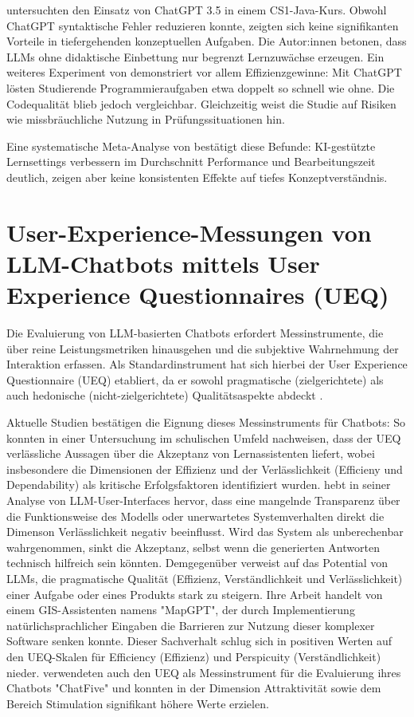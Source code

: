 \textcite[S.~3-6]{XueIntro2024} untersuchten den Einsatz von ChatGPT 3.5 in einem CS1-Java-Kurs. Obwohl ChatGPT syntaktische Fehler reduzieren konnte, zeigten sich keine signifikanten Vorteile in tiefergehenden konzeptuellen Aufgaben. Die Autor:innen betonen, dass LLMs ohne didaktische Einbettung nur begrenzt Lernzuwächse erzeugen.
Ein weiteres Experiment von \textcite[S.~6-8]{TobaTests2024} demonstriert vor allem Effizienzgewinne: Mit ChatGPT lösten Studierende Programmieraufgaben etwa doppelt so schnell wie ohne. Die Codequalität blieb jedoch vergleichbar. Gleichzeitig weist die Studie auf Risiken wie missbräuchliche Nutzung in Prüfungssituationen hin.

Eine systematische Meta-Analyse von \textcite[S.~12-15]{Alanazi2025} bestätigt diese Befunde: KI-gestützte Lernsettings verbessern im Durchschnitt Performance und Bearbeitungszeit deutlich, zeigen aber keine konsistenten Effekte auf tiefes Konzeptverständnis.



\section{User-Experience-Messungen von LLM-Chatbots mittels User Experience Questionnaires (UEQ)}
Die Evaluierung von LLM-basierten Chatbots erfordert Messinstrumente, die über reine Leistungsmetriken hinausgehen und die subjektive Wahrnehmung der Interaktion erfassen. Als Standardinstrument hat sich hierbei der User Experience Questionnaire (UEQ) etabliert, da er sowohl pragmatische (zielgerichtete) als auch hedonische (nicht-zielgerichtete) Qualitätsaspekte abdeckt \parencite[S.~2-3]{Schrepp2023UEQHandbook}.

Aktuelle Studien bestätigen die Eignung dieses Messinstruments für Chatbots: So konnten \textcite[S.~17]{Mendoza2022} in einer Untersuchung im schulischen Umfeld nachweisen, dass der UEQ verlässliche Aussagen über die Akzeptanz von Lernassistenten liefert, wobei insbesondere die Dimensionen der Effizienz und der Verlässlichkeit (Efficieny und Dependability) als kritische Erfolgsfaktoren identifiziert wurden. \textcite[]{Ambacher2024} hebt in seiner Analyse von LLM-User-Interfaces hervor, dass eine mangelnde Transparenz über die Funktionsweise des Modells oder unerwartetes Systemverhalten direkt die Dimenson Verlässlichkeit negativ beeinflusst. Wird das System als unberechenbar wahrgenommen, sinkt die Akzeptanz, selbst wenn die generierten Antworten technisch hilfreich sein könnten. Demgegenüber verweist \textcite[S.~6]{Shahu2025} auf das Potential von LLMs, die pragmatische Qualität (Effizienz, Verständlichkeit und Verlässlichkeit) einer Aufgabe oder eines Produkts stark zu steigern. Ihre Arbeit handelt von einem GIS-Assistenten namens "MapGPT", der durch Implementierung natürlichsprachlicher Eingaben die Barrieren zur Nutzung dieser komplexer Software senken konnte. Dieser Sachverhalt schlug sich in positiven Werten auf den UEQ-Skalen für Efficiency (Effizienz) und Perspicuity (Verständlichkeit) nieder. \textcite[S.~5-6]{Lee2024} verwendeten auch den UEQ als Messinstrument für die Evaluierung ihres Chatbots "ChatFive" und konnten in der Dimension Attraktivität sowie dem Bereich Stimulation signifikant höhere Werte erzielen.


